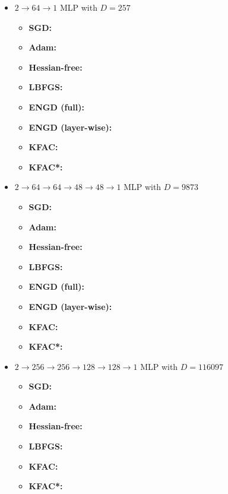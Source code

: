 \begin{itemize}
\item $2\to 64\to 1$ MLP with $D=257$
  \begin{itemize}
    \def\pathToRuns{../kfac_pinns_exp/exp13_reproduce_heat1d/tex}
  \item \textbf{SGD:} 
  \item \textbf{Adam:} 
  \item \textbf{Hessian-free:} 
  \item \textbf{LBFGS:} 
  \item \textbf{ENGD (full):} 
  \item \textbf{ENGD (layer-wise):} 
  \item \textbf{KFAC:} 
  \item \textbf{KFAC*:} 
  \end{itemize}

\item $2 \to 64 \to 64 \to 48 \to 48 \to 1$ MLP with $D=\num{9873}$
  \begin{itemize}
    \def\pathToRuns{../kfac_pinns_exp/exp22_heat1d_mlp_tanh_64/tex}
  \item \textbf{SGD:} 
  \item \textbf{Adam:} 
  \item \textbf{Hessian-free:} 
  \item \textbf{LBFGS:} 
  \item \textbf{ENGD (full):} 
  \item \textbf{ENGD (layer-wise):} 
  \item \textbf{KFAC:} 
  \item \textbf{KFAC*:} 
  \end{itemize}

\item $2 \to 256 \to 256\to 128 \to 128 \to 1$ MLP with $D=\num{116097}$
  \begin{itemize}
    \def\pathToRuns{../kfac_pinns_exp/exp23_heat1d_mlp_tanh_256/tex}
  \item \textbf{SGD:} 
  \item \textbf{Adam:} 
  \item \textbf{Hessian-free:} 
  \item \textbf{LBFGS:} 
  \item \textbf{KFAC:} 
  \item \textbf{KFAC*:} 
  \end{itemize}
\end{itemize}

